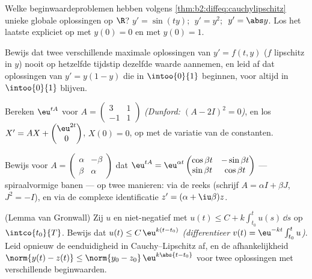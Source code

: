 \begin{exercise}[$\star$]\label{exo:b2:diffeq:2}
Welke beginwaardeproblemen hebben volgens
\cref{thm:b2:diffeq:cauchylipschitz} unieke globale oplossingen op
$\R$? $y' = \sin(ty)$; $\;y' = y^2$; $\;y' = \abs y$. Los het
laatste expliciet op met $y(0) = 0$ en met $y(0) = 1$.
\end{exercise}

\begin{exercise}[$\star$]\label{exo:b2:diffeq:3}
Bewijs dat twee verschillende maximale oplossingen van $y' =
f(t,y)$ ($f$ lipschitz in $y$) nooit op hetzelfde tijdstip dezelfde
waarde aannemen, en leid af dat oplossingen van $y' = y(1 - y)$ die
in $\intoo{0}{1}$ beginnen, voor altijd in $\intoo{0}{1}$ blijven.
\end{exercise}

\begin{exercise}[$\star\star$]\label{exo:b2:diffeq:4}
Bereken $\eu^{tA}$ voor $A = \begin{pmatrix} 3 & 1\\ -1 &
1\end{pmatrix}$ \emph{(Dunford: $(A - 2I)^2 = 0$)}, en los $X' = AX
+ \begin{pmatrix} \eu^{2t}\\ 0\end{pmatrix}$, $X(0) = 0$, op met de
variatie van de constanten.
\end{exercise}

\begin{exercise}[$\star\star$]\label{exo:b2:diffeq:5}
Bewijs voor $A = \begin{pmatrix} \alpha & -\beta\\ \beta &
\alpha\end{pmatrix}$ dat $\eu^{tA} =
\eu^{\alpha t}\begin{pmatrix} \cos\beta t & -\sin\beta t\\
\sin\beta t & \cos\beta t\end{pmatrix}$ --- spiraalvormige banen
--- op twee manieren: via de reeks (schrijf $A = \alpha I + \beta
J$, $J^2 = -I$), en via de complexe identificatie $z' = (\alpha +
\iu\beta)z$.
\end{exercise}

\begin{exercise}[$\star\star$]\label{exo:b2:diffeq:6}
(Lemma van Gronwall) Zij $u$  en niet-negatief met $u(t)
\leq C + k\int_{t_0}^{t} u(s)\,\dd s$ op $\intco{t_0}{T}$. Bewijs
dat $u(t) \leq C\,\eu^{k(t - t_0)}$ \emph{(differentieer $v(t) =
\eu^{-kt}\int_{t_0}^t u$)}. Leid opnieuw de eenduidigheid in
Cauchy--Lipschitz af, en de  afhankelijkheid $\norm{y(t) -
z(t)} \leq \norm{y_0 - z_0}\,\eu^{k\abs{t - t_0}}$ voor twee
oplossingen met verschillende beginwaarden.
\end{exercise}

